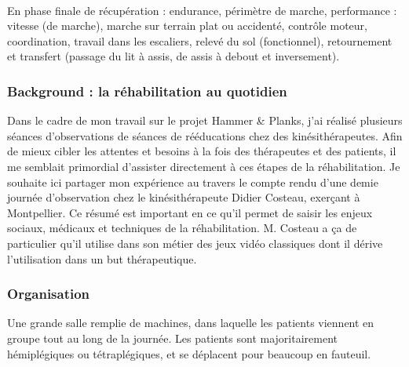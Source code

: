 \paragraph{}En phase finale de récupération : endurance, périmètre de marche, performance : vitesse (de marche), marche sur terrain plat ou accidenté, contrôle moteur, coordination, travail dans les escaliers, relevé du sol (fonctionnel), retournement et transfert (passage du lit à assis, de assis à debout et inversement).

	\subsubsection{Background : la réhabilitation au quotidien}
Dans le cadre de mon travail sur le projet Hammer \& Planks, j'ai réalisé plusieurs séances d'observations de séances de rééducations chez des kinésithérapeutes. Afin de mieux cibler les attentes et besoins à la fois des thérapeutes et des patients, il me semblait primordial d'assister directement à ces étapes de la réhabilitation. Je souhaite ici partager mon expérience au travers le compte rendu d'une demie journée d'observation chez le kinésithérapeute Didier Costeau, exerçant à Montpellier. Ce résumé est important en ce qu'il permet de saisir les enjeux sociaux, médicaux et techniques de la réhabilitation. M. Costeau a ça de particulier qu'il utilise dans son métier des jeux vidéo classiques dont il dérive l'utilisation dans un but thérapeutique.

	\subsubsection*{Organisation}
Une grande salle remplie de machines, dans laquelle les patients viennent en groupe tout au long de la journée. Les patients sont majoritairement hémiplégiques ou tétraplégiques, et se déplacent pour beaucoup en fauteuil.

